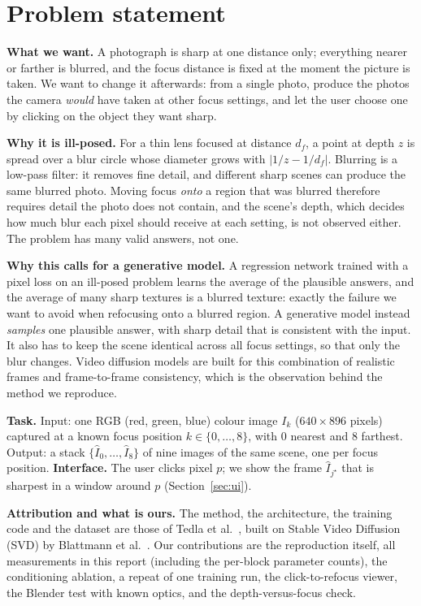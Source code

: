 \documentclass[11pt]{article}
\begin{document}
\section{Problem statement}\label{sec:problem}
\textbf{What we want.} A photograph is sharp at one distance only; everything nearer or farther is blurred, and the focus distance is fixed at the moment the picture is taken.
We want to change it afterwards: from a single photo, produce the photos the camera \emph{would} have taken at other focus settings, and let the user choose one by clicking on the object they want sharp.

\textbf{Why it is ill-posed.} For a thin lens focused at distance $d_f$, a point at depth $z$ is spread over a blur circle whose diameter grows with $|1/z-1/d_f|$.
Blurring is a low-pass filter: it removes fine detail, and different sharp scenes can produce the same blurred photo.
Moving focus \emph{onto} a region that was blurred therefore requires detail the photo does not contain, and the scene's depth, which decides how much blur each pixel should receive at each setting, is not observed either.
The problem has many valid answers, not one.

\textbf{Why this calls for a generative model.} A regression network trained with a pixel loss on an ill-posed problem learns the average of the plausible answers, and the average of many sharp textures is a blurred texture: exactly the failure we want to avoid when refocusing onto a blurred region.
A generative model instead \emph{samples} one plausible answer, with sharp detail that is consistent with the input.
It also has to keep the scene identical across all focus settings, so that only the blur changes.
Video diffusion models are built for this combination of realistic frames and frame-to-frame consistency, which is the observation behind the method we reproduce.

\textbf{Task.} Input: one RGB (red, green, blue) colour image $I_k$ ($640\times896$ pixels) captured at a known focus position $k\in\{0,\dots,8\}$, with 0 nearest and 8 farthest.
Output: a stack $\{\hat I_0,\dots,\hat I_8\}$ of nine images of the same scene, one per focus position.
\textbf{Interface.} The user clicks pixel $p$; we show the frame $\hat I_{j^\star}$ that is sharpest in a window around $p$ (Section~\ref{sec:ui}).

\textbf{Attribution and what is ours.} The method, the architecture, the training code and the dataset are those of Tedla et al.~\cite{tedla2025refocus}, built on Stable Video Diffusion (SVD) by Blattmann et al.~\cite{blattmann2023svd}.
Our contributions are the reproduction itself, all measurements in this report (including the per-block parameter counts), the conditioning ablation, a repeat of one training run, the click-to-refocus viewer, the Blender test with known optics, and the depth-versus-focus check.
\end{document}
